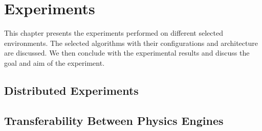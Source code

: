 
\chapter{Experiments}\label{chapter:experiments}

This chapter presents the experiments performed on different selected environments. The selected algorithms with their configurations and architecture are discussed. We then conclude with the experimental results and discuss the goal and aim of the experiment.

\section{Distributed Experiments}


\clearpage


\clearpage


\clearpage


\clearpage

\section{Transferability Between Physics Engines}


\clearpage


\clearpage





